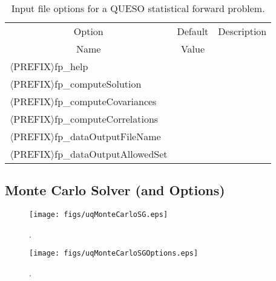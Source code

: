 \begin{table}[!h]
\begin{center}
\begin{tabular}{|l|c|c|}
\hline
\multicolumn{1}{|c|}{Option}                     & Default & Description \\
\multicolumn{1}{|c|}{Name}                       & Value   &             \\
\hline
\hline
$\langle$PREFIX$\rangle$fp\_help                 &         &             \\
\hline
$\langle$PREFIX$\rangle$fp\_computeSolution      &         &             \\
\hline
$\langle$PREFIX$\rangle$fp\_computeCovariances   &         &             \\
\hline
$\langle$PREFIX$\rangle$fp\_computeCorrelations  &         &             \\
\hline
$\langle$PREFIX$\rangle$fp\_dataOutputFileName   &         &             \\
\hline
$\langle$PREFIX$\rangle$fp\_dataOutputAllowedSet &         &             \\
\hline
\end{tabular}
\end{center}
\caption{
Input file options for a QUESO statistical forward problem.
}
\label{tab-sfp-options}
\end{table}

\clearpage
\subsection{Monte Carlo Solver (and Options)}

\begin{figure}[h!]
\centerline{
\texttt{[image: figs/uqMonteCarloSG.eps]}
}
\caption{
{\color{red}{The Monte Carlo sequence generator class}}.
}
\label{fig-monte-carlo-solver-class}
\end{figure}

\begin{figure}[h!]
\begin{center}
\texttt{[image: figs/uqMonteCarloSGOptions.eps]}
\end{center}
\caption{
{\color{red}{The Monte Carlo sequence generator options class}}.
}
\label{fig-monte-carlo-options-class}
\end{figure}

